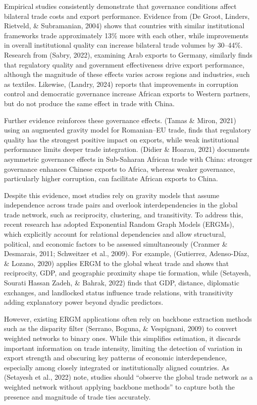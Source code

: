 \documentclass[
]{article}
\begin{document}
Empirical studies consistently demonstrate that governance conditions
affect bilateral trade costs and export performance. Evidence from (De
Groot, Linders, Rietveld, \& Subramanian, 2004) shows that countries
with similar institutional frameworks trade approximately 13\% more with
each other, while improvements in overall institutional quality can
increase bilateral trade volumes by 30--44\%. Research from (Sabry,
2022), examining Arab exports to Germany, similarly finds that
regulatory quality and government effectiveness drive export
performance, although the magnitude of these effects varies across
regions and industries, such as textiles. Likewise, (Landry, 2024)
reports that improvements in corruption control and democratic
governance increase African exports to Western partners, but do not
produce the same effect in trade with China.

Further evidence reinforces these governance effects. (Tamas \& Miron,
2021) using an augmented gravity model for Romanian--EU trade, finds
that regulatory quality has the strongest positive impact on exports,
while weak institutional performance limits deeper trade integration.
(Didier \& Hoarau, 2021) documents asymmetric governance effects in
Sub-Saharan African trade with China: stronger governance enhances
Chinese exports to Africa, whereas weaker governance, particularly
higher corruption, can facilitate African exports to China.

Despite this evidence, most studies rely on gravity models that assume
independence across trade pairs and overlook interdependencies in the
global trade network, such as reciprocity, clustering, and transitivity.
To address this, recent research has adopted Exponential Random Graph
Models (ERGMs), which explicitly account for relational dependencies and
allow structural, political, and economic factors to be assessed
simultaneously (Cranmer \& Desmarais, 2011; Schweitzer et al., 2009).
For example, (Gutierrez, Adenso-Díaz, \& Lozano, 2020) applies ERGM to
the global wheat trade and shows that reciprocity, GDP, and geographic
proximity shape tie formation, while (Setayesh, Sourati Hassan Zadeh, \&
Bahrak, 2022) finds that GDP, distance, diplomatic exchanges, and
landlocked status influence trade relations, with transitivity adding
explanatory power beyond dyadic predictors.

However, existing ERGM applications often rely on backbone extraction
methods such as the disparity filter (Serrano, Boguna, \& Vespignani,
2009) to convert weighted networks to binary ones. While this simplifies
estimation, it discards important information on trade intensity,
limiting the detection of variation in export strength and obscuring key
patterns of economic interdependence, especially among closely
integrated or institutionally aligned countries. As (Setayesh et al.,
2022) note, studies should ``observe the global trade network as a
weighted network without applying backbone methods'' to capture both the
presence and magnitude of trade ties accurately.
\end{document}
